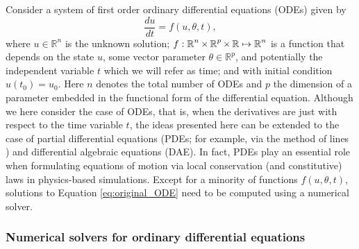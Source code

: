 Consider a system of first order ordinary differential equations (ODEs) given by
\begin{equation}
 \frac{du}{dt} = f(u, \theta, t),
 \label{eq:original_ODE}
\end{equation}
where $u \in \mathbb{R}^n$ is the unknown solution; $f: \operatorname{\mathbb{R}}^n \times \operatorname{\mathbb{R}}^p \times \operatorname{\mathbb{R}} \mapsto \operatorname{\mathbb{R}}^n$ is a function that depends on the state $u$, some vector parameter $\theta \in \mathbb R^p$, and potentially the independent variable $t$ which we will refer as time; and with initial condition $u(t_0) = u_0$.
Here $n$ denotes the total number of ODEs and $p$ the dimension of a parameter embedded in the functional form of the differential equation.
Although we here consider the case of ODEs, that is, when the derivatives are just with respect to the time variable $t$, the ideas presented here can be extended to the case of partial differential equations (PDEs; for example, via the method of lines \cite{ascher2008numerical}) and differential algebraic equations (DAE).
In fact, PDEs play an essential role when formulating equations of motion via local conservation (and constitutive) laws in physics-based simulations.
Except for a minority of functions $f(u,\theta, t)$, solutions to Equation \eqref{eq:original_ODE} need to be computed using a numerical solver. 

\subsubsection{Numerical solvers for ordinary differential equations}
\label{section:intro-numerical-solvers}

